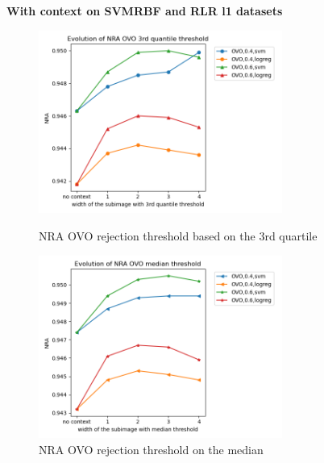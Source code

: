 \documentclass{siamart171218}
\begin{document}
\textbf{With context on SVMRBF and RLR l1 datasets}

\begin{figure}[h!]
    \begin{minipage}[c]{.46\linewidth}
        \centering
        \includegraphics[width=8cm]{images/NRA_OVO_quartile.png}
        \caption{NRA OVO rejection threshold based on the 3rd quartile}
        \label{NRA_3rd_quartile}
    \end{minipage}
    \hfill
    \begin{minipage}[c]{.46\linewidth}
        \centering
        \includegraphics[width=8cm]{images/NRA_OVO_median.png}
        \caption{NRA OVO rejection threshold on the median}
        \label{NRA_median}
    \end{minipage}
    \hfill
\end{figure}
\end{document}
